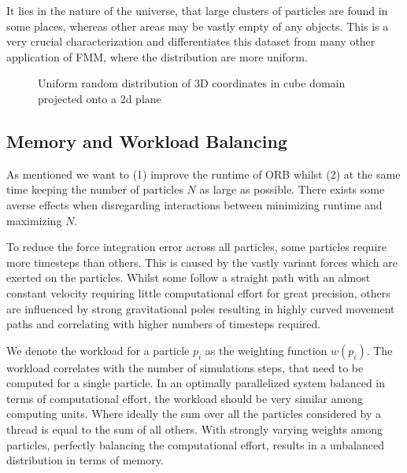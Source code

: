 \documentclass[]{article}
\begin{document}
It lies in the nature of the universe, that large clusters of particles are found in some places, whereas other areas may be vastly empty of any objects. This is a very crucial characterization and differentiates this dataset from many other application of FMM, where the distribution are more uniform.

\begin{figure}[H]
	\begin{center}
	\end{center}
	\caption{Uniform random distribution of 3D coordinates in cube domain projected onto a 2d plane}
\end{figure}


\subsection{Memory and Workload Balancing}\label{balancing}
As mentioned we want to (1) improve the runtime of ORB whilst (2) at the same time keeping the number of particles $N$ as large as possible. There exists some averse effects when disregarding interactions between minimizing runtime and maximizing $N$.

To reduce the force integration error across all particles, some particles require more timesteps than others. This is caused by the vastly variant forces which are exerted on the particles. Whilst some follow a straight path with an almost constant velocity requiring little computational effort for great precision, others are influenced by strong gravitational poles resulting in highly curved movement paths and correlating with higher numbers of timesteps required.

We denote the workload for a particle $p_i$ as the weighting function $w(p_i)$. The workload correlates with the number of simulations steps, that need to be computed for a single particle. In an optimally parallelized system balanced in terms of computational effort, the workload should be very similar among computing units. Where ideally the sum over all the particles considered by a thread is equal to the sum of all others. With strongly varying weights among particles, perfectly balancing the computational effort, results in a unbalanced distribution in terms of memory. 
\end{document}
